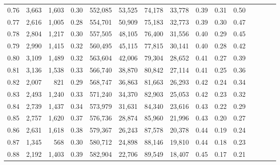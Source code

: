 \begin{tabular}{rrrcrrrrrrrrrrr}
0.76 &   3,663 &  1,603 &                                       0.30 &  552,085 &   53,525 &   74,178 &   33,778 &  0.39 &  0.31 &                         0.50 \\
0.77 &   2,616 &  1,005 &                                       0.28 &  554,701 &   50,909 &   75,183 &   32,773 &  0.39 &  0.30 &                         0.47 \\
0.78 &   2,804 &  1,217 &                                       0.30 &  557,505 &   48,105 &   76,400 &   31,556 &  0.40 &  0.29 &                         0.45 \\
0.79 &   2,990 &  1,415 &                                       0.32 &  560,495 &   45,115 &   77,815 &   30,141 &  0.40 &  0.28 &                         0.42 \\
0.80 &   3,109 &  1,489 &                                       0.32 &  563,604 &   42,006 &   79,304 &   28,652 &  0.41 &  0.27 &                         0.39 \\
0.81 &   3,136 &  1,538 &                                       0.33 &  566,740 &   38,870 &   80,842 &   27,114 &  0.41 &  0.25 &                         0.36 \\
0.82 &   2,007 &    821 &                                       0.29 &  568,747 &   36,863 &   81,663 &   26,293 &  0.42 &  0.24 &                         0.34 \\
0.83 &   2,493 &  1,240 &                                       0.33 &  571,240 &   34,370 &   82,903 &   25,053 &  0.42 &  0.23 &                         0.32 \\
0.84 &   2,739 &  1,437 &                                       0.34 &  573,979 &   31,631 &   84,340 &   23,616 &  0.43 &  0.22 &                         0.29 \\
0.85 &   2,757 &  1,620 &                                       0.37 &  576,736 &   28,874 &   85,960 &   21,996 &  0.43 &  0.20 &                         0.27 \\
0.86 &   2,631 &  1,618 &                                       0.38 &  579,367 &   26,243 &   87,578 &   20,378 &  0.44 &  0.19 &                         0.24 \\
0.87 &   1,345 &    568 &                                       0.30 &  580,712 &   24,898 &   88,146 &   19,810 &  0.44 &  0.18 &                         0.23 \\
0.88 &   2,192 &  1,403 &                                       0.39 &  582,904 &   22,706 &   89,549 &   18,407 &  0.45 &  0.17 &                         0.21 \\

\end{tabular}
